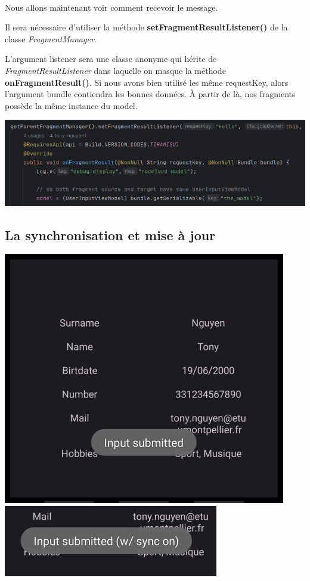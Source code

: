 \documentclass[a4paper]{article}
\begin{document}
\begin{multicols}{2}
                \paragraph{}
                    Nous allons maintenant voir comment recevoir le message.

                    Il sera nécessaire d'utiliser la méthode \textbf{setFragmentResultListener()} de la classe \emph{FragmentManager}.

                    L'argument listener sera une classe anonyme qui hérite de \emph{FragmentResultListener} dans laquelle on masque la méthode \textbf{onFragmentResult()}. Si nous avons bien utilisé les même requestKey, alors l'argument bundle contiendra les bonnes données. À partir de là, nos fragments possède la même instance du model.

                    \noindent\includegraphics[width=.47\textwidth]{fragment/fragmentListen}
            \subsection{La synchronisation et mise à jour}
                \noindent\includegraphics[width=.47\textwidth]{fragment/submittedSmall}
                \noindent\includegraphics[width=.47\textwidth]{fragment/syncSmall}

\end{multicols}
\end{document}
